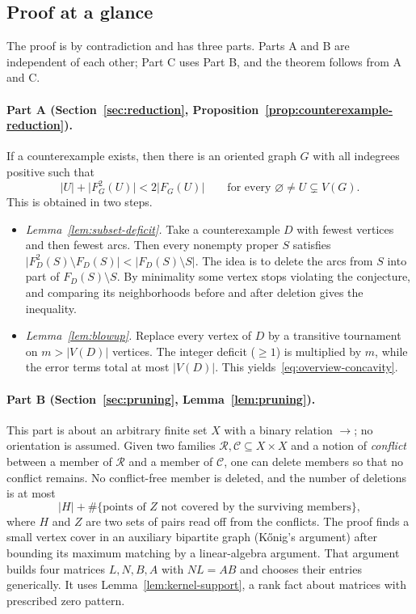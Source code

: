 \documentclass[11pt]{article}
\theoremstyle{remark}
\newcommand{\abs}[1]{\lvert #1\rvert}
\begin{document}
\subsection{Proof at a glance}\label{subsec:glance}

The proof is by contradiction and has three parts.  Parts A and B are
independent of each other; Part C uses Part B, and the theorem follows from
A and C.

\paragraph{Part A (Section~\ref{sec:reduction},
Proposition~\ref{prop:counterexample-reduction}).}
If a counterexample exists, then there is an oriented graph $G$ with all
indegrees positive such that
\begin{equation}\label{eq:overview-concavity}
 \abs{U}+\abs{F_G^2(U)}<2\abs{F_G(U)}
 \qquad\text{for every }\varnothing\ne U\subsetneq V(G).
\end{equation}
This is obtained in two steps.
\begin{itemize}[nosep]
\item \emph{Lemma~\ref{lem:subset-deficit}.}  Take a counterexample $D$ with
 fewest vertices and then fewest arcs.  Then every nonempty proper $S$
 satisfies $\abs{F_D^2(S)\setminus F_D(S)}<\abs{F_D(S)\setminus S}$.
 The idea is to delete the arcs from $S$ into part of $F_D(S)\setminus S$.
 By minimality some vertex stops violating the conjecture, and comparing its
 neighborhoods before and after deletion gives the inequality.
\item \emph{Lemma~\ref{lem:blowup}.}  Replace every vertex of $D$ by a
 transitive tournament on $m>\abs{V(D)}$ vertices.  The integer deficit
 ($\ge1$) is multiplied by $m$, while the error terms total at most
 $\abs{V(D)}$.  This yields~\eqref{eq:overview-concavity}.
\end{itemize}

\paragraph{Part B (Section~\ref{sec:pruning}, Lemma~\ref{lem:pruning}).}
This part is about an arbitrary finite set $X$ with a binary relation $\to$;
no orientation is assumed.  Given two families
$\mathcal R,\mathcal C\subseteq X\times X$ and a notion of \emph{conflict}
between a member of $\mathcal R$ and a member of $\mathcal C$, one can delete
members so that no conflict remains.  No conflict-free member is deleted,
and the number of deletions is at most
\[
 \abs H+\#\{\text{points of }Z\text{ not covered by the surviving members}\},
\]
where $H$ and $Z$ are two sets of pairs read off from the conflicts.
The proof finds a small vertex cover in an auxiliary bipartite graph
(K\H{o}nig's argument) after bounding its maximum matching by a
linear-algebra argument.  That argument builds four matrices
$L,N,B,A$ with $NL=AB$ and chooses their entries generically.  It uses
Lemma~\ref{lem:kernel-support}, a rank fact about matrices with prescribed
zero pattern.
\end{document}

